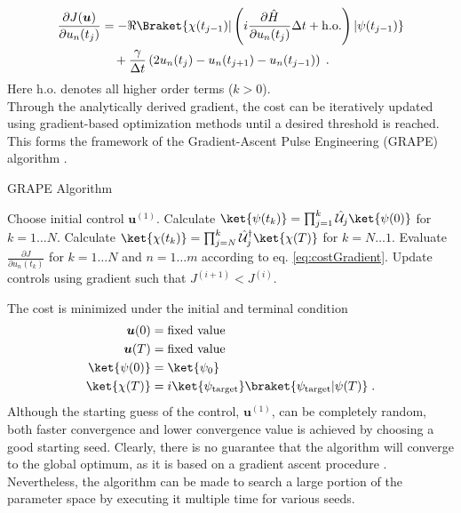 \begin{align}
	\frac{\partial J (\boldsymbol{u})}{\partial u_n (t_j)}  &= - \Re \Braket{\chi (t_{j-1}) | \left( i \frac{\partial \hat{H}}{\partial u_n (t_j)} \Delta t + \mathrm{h.o.} \right)  | \psi (t_{j-1})}  \nonumber \\
	& \quad + \frac{\gamma}{\Delta t} \left( 2 u_n (t_j) - u_n (t_{j+1}) - u_n (t_{j-1}) \right) \; .
	\label{eq:costGradient}
\end{align}
Here $\mathrm{h.o.}$ denotes all higher order terms ($k > 0$).\\ 
Through the analytically derived gradient, the cost can be iteratively updated using gradient-based optimization methods until a desired threshold is reached. This forms the framework of the Gradient-Ascent Pulse Engineering (GRAPE) algorithm \cite{Khaneja2005}.
\begin{algorithm}
\begin{algorithmic}
\caption{GRAPE Algorithm}
\State Choose initial control $\boldsymbol{u}^{(1)}$.
	\State Calculate $\ket{\psi (t_k)} = \prod_{j=1}^{k} \hat{\mathcal{U}}_j \ket{\psi (0)}$ for $k = 1 \ldots N$.
	\State Calculate $\ket{\chi (t_k)} = \prod_{j=N}^{k} \hat{\mathcal{U}}_{j}^{\dag} \ket{\chi (T)}$ for $k = N \ldots 1$. 
	\State Evaluate $\frac{\partial J}{\partial u_n (t_k)}$ for $k = 1 \ldots N$ and $n = 1 \ldots m$ according to eq. \eqref{eq:costGradient}.
	\State Update controls using gradient such that $J^{(i + 1)} < J^{(i)}$. 
\EndWhile
\end{algorithmic}
\end{algorithm}
The cost is minimized under the initial and terminal condition
\begin{align}
	\boldsymbol{u}(0) &= \text{fixed value} \label{eq:firstBound} \\
	\boldsymbol{u}(T) &= \text{fixed value} \\
	\ket{\psi (0)} &= \ket{\psi_0} \\
	\ket{\chi (T)} &= i \ket{\psi_{\mathrm{target}}} \braket{\psi_{\mathrm{target}} | \psi (T)} \; .  \label{eq:lastBound}
\end{align}
Although the starting guess of the control, $\boldsymbol{u}^{(1)}$, can be completely random, both faster convergence and lower convergence value is achieved by choosing a good starting seed. Clearly, there is no guarantee that the algorithm will converge to the global optimum, as it is based on a gradient ascent procedure \cite{Khaneja2005}. Nevertheless, the algorithm can be made to search a large portion of the parameter space by executing it multiple time for various seeds.  

